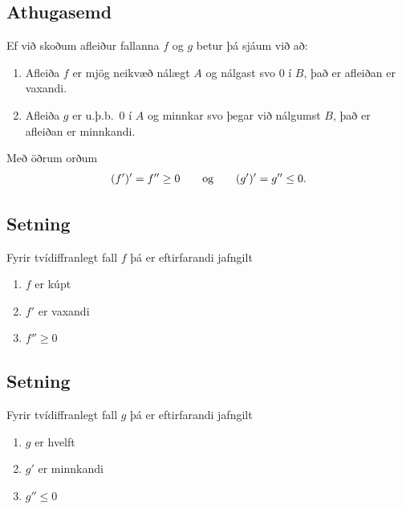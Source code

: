 \documentclass[a4paper,10pt,icelandic]{sphinxmanual}
\begin{document}
\subsection{Athugasemd}
\label{kafli05:athugasemd}
Ef við skoðum afleiður fallanna \(f\) og \(g\) betur þá sjáum
við að:
\begin{enumerate}
\item {} 
Afleiða \(f\) er mjög neikvæð nálægt \(A\) og nálgast svo 0
í \(B\), það er afleiðan er vaxandi.

\item {} 
Afleiða \(g\) er u.þ.b. 0 í \(A\) og minnkar svo þegar við
nálgumst \(B\), það er afleiðan er minnkandi.

\end{enumerate}

Með öðrum orðum
\begin{gather}
\begin{split}(f')' = f'' \geq 0 \qquad   \text{og} \qquad
    (g')' = g'' \leq 0.\end{split}\notag
\end{gather}

\subsection{Setning}
\label{kafli05:setning}
Fyrir tvídiffranlegt fall \(f\) þá er eftirfarandi jafngilt
\begin{enumerate}
\item {} 
\(f\) er kúpt

\item {} 
\(f'\) er vaxandi

\item {} 
\(f'' \geq 0\)

\end{enumerate}


\subsection{Setning}
\label{kafli05:index-1}\label{kafli05:id3}
Fyrir tvídiffranlegt fall \(g\) þá er eftirfarandi jafngilt
\begin{enumerate}
\item {} 
\(g\) er hvelft

\item {} 
\(g'\) er minnkandi

\item {} 
\(g'' \leq 0\)

\end{enumerate}
\end{document}
